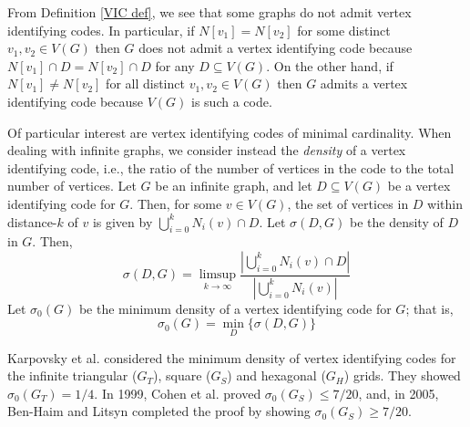 \documentclass[12pt]{report}
\numberwithin{equation}{chapter}
\theoremstyle{definition}
\theoremstyle{remark}
\begin{document}
\bigskip

From Definition \ref{VIC def}, we see that some graphs do not admit vertex identifying codes.  In particular, if $N[v_1] = N[v_2]$ for some distinct $v_1, v_2 \in V(G)$ then $G$ does not admit a vertex identifying code because $N[v_1] \cap D = N[v_2] \cap D$ for any $D \subseteq V(G)$.  On the other hand, if $N[v_1] \not = N[v_2]$ for all distinct $v_1, v_2 \in V(G)$ then $G$ admits a vertex identifying code because $V(G)$ is such a code.


Of particular interest are vertex identifying codes of minimal cardinality.  When dealing with infinite graphs, we consider instead the \emph{density} of a vertex identifying code, i.e., the ratio of the number of vertices in the code to the total number of vertices.  Let $G$ be an infinite graph, and let $D \subseteq V(G)$ be a vertex identifying code for $G$.  Then, for some $v \in V(G)$, the set of vertices in $D$ within distance-$k$ of $v$ is given by $\bigcup_{i=0}^{k} N_i(v) \cap D$.  Let $\sigma(D,G)$ be the density of $D$ in $G$.  Then,
\begin{equation}
\label{density eq}
\sigma(D,G) = \displaystyle\limsup_{k \to \infty} \frac{ \left | \bigcup_{i=0}^{k} N_i(v) \cap D \right | }{ \left | \bigcup_{i=0}^{k} N_i(v) \right | }
\end{equation}
Let $\sigma_0(G)$ be the minimum density of a vertex identifying code for $G$; that is,
\begin{equation}
\sigma_0(G) = \min_D\{ \sigma(D,G) \}
\end{equation}



Karpovsky et al. \cite{karpovsky} considered the minimum density of vertex identifying codes for the infinite triangular ($G_T$), square ($G_S$) and hexagonal ($G_H$) grids.  They showed $\sigma_0(G_T) = 1/4$.  In 1999, Cohen et al. \cite{cohen1999} proved $\sigma_0(G_S) \leq 7/20$, and, in 2005, Ben-Haim and Litsyn \cite{benhaim} completed the proof by showing $\sigma_0(G_S) \geq 7/20$.  
\end{document}
